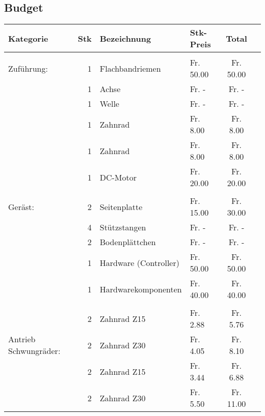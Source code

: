 \subsection{Budget}
    \begin{longtable}{p{1.7cm}rllcc}
    \textbf{Kategorie} & \textbf{Stk} & \textbf{Bezeichnung} & \textbf{Stk-Preis}
    & \textbf{Total} \\
    \hline     &       &                              &            &            \\
    Zuführung: & 1     & Flachbandriemen 	          &  Fr. 50.00 &  Fr. 50.00 \\
               & 1     & Achse          	          &  Fr. -     &  Fr. -     \\
               & 1     & Welle                     	  &  Fr. -     &  Fr. -     \\
               & 1     & Zahnrad         	          &  Fr. 8.00  &  Fr. 8.00  \\
               & 1     & Zahnrad         	          &  Fr. 8.00  &  Fr. 8.00  \\
               & 1     & DC-Motor        	          &  Fr. 20.00 &  Fr. 20.00 \\
               &       &                 	          &            &            \\
       Geräst: & 2     & Seitenplatte    	          &  Fr. 15.00 &  Fr. 30.00 \\
               & 4     & Stützstangen    	          &  Fr. -     &  Fr. -     \\
               & 2     & Bodenplättchen  	          &  Fr. -     &  Fr. -     \\
               & 1     & Hardware (Controller)        &  Fr. 50.00 &  Fr. 50.00 \\
               & 1     & Hardwarekomponenten          &  Fr. 40.00 &  Fr. 40.00 \\
               &       &       				          &      	   &            \\
   \multirow{3}{1.7cm}{Antrieb Schwungräder:}  
               & 2     & Zahnrad Z15                  &  Fr. 2.88  &  Fr. 5.76  \\
               & 2     & Zahnrad Z30 	              &  Fr. 4.05  &  Fr. 8.10  \\
               & 2     & Zahnrad Z15 	        	  &  Fr. 3.44  &  Fr. 6.88  \\
               & 2     & Zahnrad Z30 	         	  &  Fr. 5.50  &  Fr. 11.00 \\

\end{longtable}
